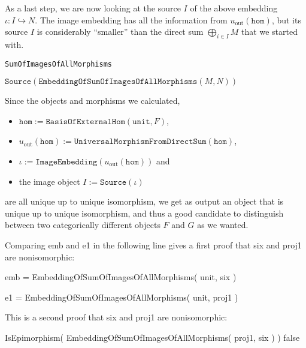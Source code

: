 As a last step, we are now looking at the source $I$ of the above embedding $\iota : I \hookrightarrow N$. The image
embedding has all the information from $u_{\text{out}}(\mathtt{hom})$, but its source $I$ is considerably ``smaller'' than the
direct sum $\bigoplus_{i\in I} M$ that we started with. 

\begin{algorithm}[H]\capstart
    \caption{\texttt{SumOfImagesOfAllMorphisms}}\label{algo:SumOfImagesOfAllMorphisms}
	\BlankLine
	\Return $\mathtt{Source}( \mathtt{EmbeddingOfSumOfImagesOfAllMorphisms}( M, N ) )$\;
\end{algorithm}

Since the objects and morphisms we calculated,
\begin{itemize}
\item $\mathtt{hom} := \mathtt{BasisOfExternalHom}(\mathtt{unit},F)$,
\item $u_{\text{out}}(\mathtt{hom}) := \mathtt{UniversalMorphismFromDirectSum}(\mathtt{hom})$,
\item $\iota := \mathtt{ImageEmbedding}(u_{\text{out}}(\mathtt{hom}))$ and
\item the image object $I := \mathtt{Source}(\iota)$
\end{itemize}
are all unique up to unique isomorphism, we get as output an object that is unique up to unique isomorphism, and thus a good candidate to distinguish
between two categorically different objects $F$ and $G$ as we wanted.

\begin{example} %
Comparing emb and e1 in the following line gives a first proof that six and proj1 are nonisomorphic:

emb = EmbeddingOfSumOfImagesOfAllMorphisms( unit, six )

e1 = EmbeddingOfSumOfImagesOfAllMorphisms( unit, proj1 )

This is a second proof that six and proj1 are nonisomorphic:

IsEpimorphism( EmbeddingOfSumOfImagesOfAllMorphisms( proj1, six ) )
false
\end{example}
